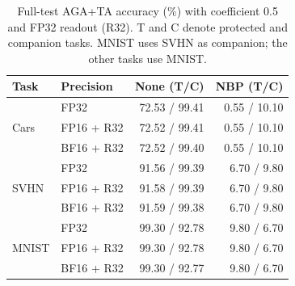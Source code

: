 \begin{table}[!htbp]
\centering
\small
\setlength{\tabcolsep}{3pt}
\caption{Full-test AGA+TA accuracy (\%) with coefficient 0.5 and FP32 readout (R32). T and C denote protected and companion tasks. MNIST uses SVHN as companion; the other tasks use MNIST.}
\label{tab:precision-merging}
\begin{tabular}{llrr}
\toprule
Task & Precision & None (T/C) & NBP (T/C) \\
\midrule
\multirow{3}{*}{Cars} & FP32 & 72.53 / 99.41 & 0.55 / 10.10 \\
 & FP16 + R32 & 72.52 / 99.41 & 0.55 / 10.10 \\
 & BF16 + R32 & 72.52 / 99.40 & 0.55 / 10.10 \\
\midrule
\multirow{3}{*}{SVHN} & FP32 & 91.56 / 99.39 & 6.70 / 9.80 \\
 & FP16 + R32 & 91.58 / 99.39 & 6.70 / 9.80 \\
 & BF16 + R32 & 91.59 / 99.38 & 6.70 / 9.80 \\
\midrule
\multirow{3}{*}{MNIST} & FP32 & 99.30 / 92.78 & 9.80 / 6.70 \\
 & FP16 + R32 & 99.30 / 92.78 & 9.80 / 6.70 \\
 & BF16 + R32 & 99.30 / 92.77 & 9.80 / 6.70 \\
\bottomrule
\end{tabular}
\end{table}
